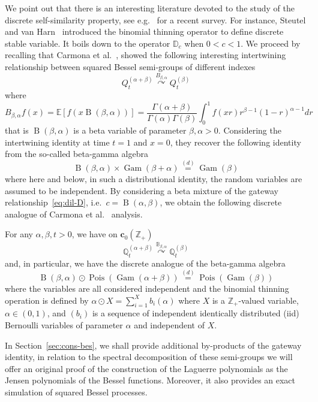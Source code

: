\documentclass[10pt]{amsart}
\theoremstyle{definition}\newtheorem{defi}[theo]{Definition}\newtheorem{rema}[theo]{Remark}\newtheorem{exam}[theo]{Example}\newtheorem{exem}[theo]{Example}\newtheorem{nota}[theo]{Notation}
\DeclareMathOperator{\Pois}{Pois}
\DeclareMathOperator{\Gam}{Gam}
\DeclareMathOperator{\rmB}{B}
\newcommand{\ZZ}{\mathbb{Z}}
\newcommand{\esc}{\mathbf{c}}
\newcommand*\E{{\mathbb E}}
\newcommand{\discret}[1]{\mathds{#1}}
\newcommand{\Gate}[3]{#1\stackrel{#2}{\curvearrowright}#3}
\begin{document}
We point out that there is an interesting literature devoted to the study of the discrete self-similarity property, see e.g.~\cite{Klebanov} for a recent survey. For instance, Steutel and van Harn~\cite{Steutel-vanHarn} introduced the binomial thinning operator to define discrete stable variable. It boils down to the operator $\discret{D}_c$ when $0<c<1$. We proceed by recalling that Carmona et al.~\cite{Carmona-Petit-Yor-98}, showed the following interesting intertwining relationship between squared Bessel semi-groups of different indexes
\[\label{eq:beta-gamma}
\Gate{Q^{(\alpha+\beta)}_t}{ {{B}}_{\beta,\alpha}}{Q^{(\beta)}_t}
\]
where
\[
{{B}}_{\beta,\alpha}f(x)=\E\left[f(x \rmB({\beta,\alpha}))\right] =
\frac{\Gamma(\alpha+\beta)}{\Gamma(\alpha)\Gamma(\beta)}\int_{0}^{1}f(xr)r^{\beta-1}(1-r)^{\alpha-1}dr
\]
that is $\rmB({\beta,\alpha})$ is a beta variable of parameter $\beta,\alpha>0$. Considering the intertwining identity at time $t=1$ and $x=0$, they recover the following identity from the so-called beta-gamma algebra
\[
\rmB({\beta,\alpha})\times \Gam({\beta+\alpha})\stackrel{(d)}{=}\Gam({\beta})
\]
where here and below, in such a distributional identity, the random variables are assumed to be independent. By considering a beta mixture of the gateway relationship~\eqref{eq:dil-D}, i.e.~$c=\rmB(\alpha,\beta)$, we obtain the following discrete analogue of Carmona et al.~\cite{Carmona-Petit-Yor-98} analysis.

\begin{prop}\label{prop:beta-gam-d}
For any $\alpha,\beta,t>0$, we have on $\esc_0(\ZZ_+)$
\begin{equation}\label{eq:int-dbeta-gamma}
\Gate{\discret{Q}^{(\alpha+\beta)}_t}{\discret{B}_{\beta,\alpha}}{\discret Q^{(\beta)}_t}
\end{equation}
and, in particular, we have the discrete analogue of the beta-gamma algebra
\[
\rmB({\beta,\alpha}) \odot\Pois(\Gam(\alpha+\beta))\stackrel{(d)}{=}\Pois(\Gam(\beta))
\]
where the variables are all considered independent and the binomial thinning operation is defined by $\alpha \odot X = \sum_{i=1}^{X}b_i(\alpha)$ where $X$ is a $\mathbb{Z}_+$-valued variable, $\alpha \in (0, 1)$, and $(b_i)$ is a sequence of independent identically distributed (iid) Bernoulli variables of parameter $\alpha$ and independent of $X$.
\end{prop}

In Section~\ref{sec:cons-bes}, we shall provide additional by-products of the gateway identity, in relation to the spectral decomposition of these semi-groups we will offer an original proof of the construction of the Laguerre polynomials as the Jensen polynomials of the Bessel functions. Moreover, it also provides an exact simulation of squared Bessel processes.
\end{document}
